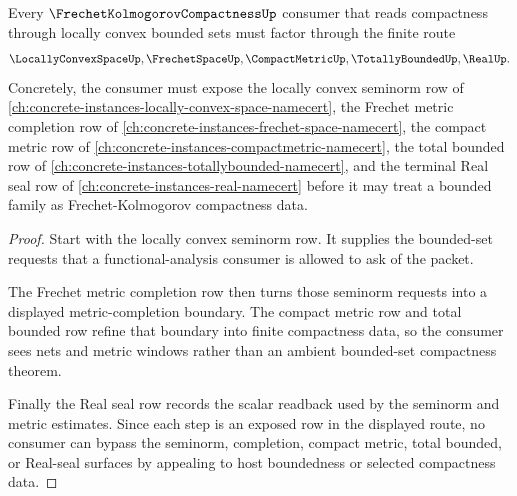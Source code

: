 \begin{theorem}
\label{thm:frechet-kolmogorov-locally-convex-boundedness-route}
Every $\FrechetKolmogorovCompactnessUp$ consumer that reads compactness through locally convex bounded sets must factor through the finite route
$$
\LocallyConvexSpaceUp,\FrechetSpaceUp,\CompactMetricUp,\TotallyBoundedUp,\RealUp .
$$
Concretely, the consumer must expose the locally convex seminorm row of \autoref{ch:concrete-instances-locally-convex-space-namecert}, the Frechet metric completion row of \autoref{ch:concrete-instances-frechet-space-namecert}, the compact metric row of \autoref{ch:concrete-instances-compactmetric-namecert}, the total bounded row of \autoref{ch:concrete-instances-totallybounded-namecert}, and the terminal Real seal row of \autoref{ch:concrete-instances-real-namecert} before it may treat a bounded family as Frechet-Kolmogorov compactness data.
\end{theorem}
\begin{proof}
Start with the locally convex seminorm row. It supplies the bounded-set requests that a functional-analysis consumer is allowed to ask of the packet.

The Frechet metric completion row then turns those seminorm requests into a displayed metric-completion boundary. The compact metric row and total bounded row refine that boundary into finite compactness data, so the consumer sees nets and metric windows rather than an ambient bounded-set compactness theorem.

Finally the Real seal row records the scalar readback used by the seminorm and metric estimates. Since each step is an exposed row in the displayed route, no consumer can bypass the seminorm, completion, compact metric, total bounded, or Real-seal surfaces by appealing to host boundedness or selected compactness data.
\end{proof}
